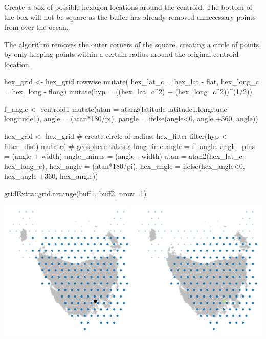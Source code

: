 Create a box of possible hexagon locations around the centroid. The
bottom of the box will not be square as the buffer has already removed
unnecessary points from over the ocean.

The algorithm removes the outer corners of the square, creating a circle
of points, by only keeping points within a certain radius around the
original centroid location.

\begin{Schunk}
\begin{Sinput}
    hex_grid <- hex_grid %
        rowwise %
        mutate(
        hex_lat_c = hex_lat - flat,
        hex_long_c = hex_long - flong) %
        mutate(hyp = ((hex_lat_c^2) + (hex_long_c^2))^(1/2))


        f_angle <- centroid1 %
            mutate(atan = atan2(latitude-latitude1,longitude-longitude1),
                angle = (atan*180/pi),
                pangle = ifelse(angle<0, angle +360, angle)) %


        hex_grid <- hex_grid %
            # create circle of radius: hex_filter
            filter(hyp < filter_dist) %
            mutate(
                # geosphere takes a long time
                angle = f_angle,
                angle_plus = (angle + width)%
                angle_minus = (angle - width)%
                atan = atan2(hex_lat_c, hex_long_c),
                hex_angle = (atan*180/pi),
                hex_angle = ifelse(hex_angle<0, hex_angle +360, hex_angle))
\end{Sinput}
\end{Schunk}

\begin{Schunk}
\begin{Sinput}
gridExtra::grid.arrange(buff1, buff2, nrow=1)
\end{Sinput}

\includegraphics{algorithmRjournal_files/figure-latex/buffers-1} \end{Schunk}

